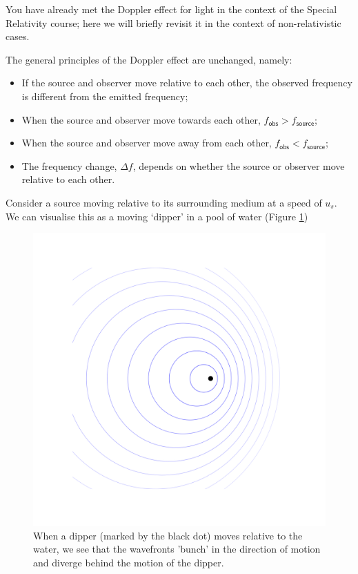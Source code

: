 \documentclass[
]{book}
\providecommand{\tightlist}{%
  \setlength{\itemsep}{0pt}\setlength{\parskip}{0pt}}
\begin{document}
You have already met the Doppler effect for light in the context of the Special Relativity course; here we will briefly revisit it in the context of non-relativistic cases.

The general principles of the Doppler effect are unchanged, namely:

\begin{itemize}
\tightlist
\item
  If the source and observer move relative to each other, the observed frequency is different from the emitted frequency;
\item
  When the source and observer move towards each other, \(f_{\textsf{obs}} > f_{\textsf{source}}\);
\item
  When the source and observer move away from each other, \(f_{\textsf{obs}} < f_{\textsf{source}}\);
\item
  The frequency change, \(\Delta f\), depends on whether the source or observer move relative to each other.
\end{itemize}

Consider a source moving relative to its surrounding medium at a speed of \(u_s\). We can visualise this as a moving `dipper' in a pool of water (Figure \ref{fig:ch9-dopplerdipper1})

\begin{figure}

{\centering \includegraphics[width=0.7\linewidth]{visualisations/ch9-doppler1} 

}

\caption{When a dipper (marked by the black dot) moves relative to the water, we see that the wavefronts 'bunch' in the direction of motion and diverge behind the motion of the dipper.}\label{fig:ch9-dopplerdipper1}
\end{figure}
\end{document}
